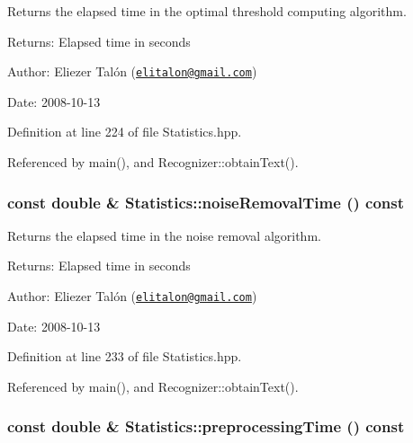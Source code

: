 Returns the elapsed time in the optimal threshold computing algorithm. 

\begin{Desc}
\item[Returns:]Elapsed time in seconds\end{Desc}
\begin{Desc}
\item[Author:]Eliezer Talón (\href{mailto:elitalon@gmail.com}{\tt elitalon@gmail.com}) \end{Desc}
\begin{Desc}
\item[Date:]2008-10-13 \end{Desc}


Definition at line 224 of file Statistics.hpp.

Referenced by main(), and Recognizer::obtainText().\hypertarget{class_statistics_ba44f1b2567a77f99ee15c11bda6312a}{
\subsubsection[noiseRemovalTime]{\setlength{\rightskip}{0pt plus 5cm}const double \& Statistics::noiseRemovalTime () const}}
\label{class_statistics_ba44f1b2567a77f99ee15c11bda6312a}


Returns the elapsed time in the noise removal algorithm. 

\begin{Desc}
\item[Returns:]Elapsed time in seconds\end{Desc}
\begin{Desc}
\item[Author:]Eliezer Talón (\href{mailto:elitalon@gmail.com}{\tt elitalon@gmail.com}) \end{Desc}
\begin{Desc}
\item[Date:]2008-10-13 \end{Desc}


Definition at line 233 of file Statistics.hpp.

Referenced by main(), and Recognizer::obtainText().\hypertarget{class_statistics_9b1c2d1f1338069346c80293a2c11b6d}{
\subsubsection[preprocessingTime]{\setlength{\rightskip}{0pt plus 5cm}const double \& Statistics::preprocessingTime () const}}
\label{class_statistics_9b1c2d1f1338069346c80293a2c11b6d}


